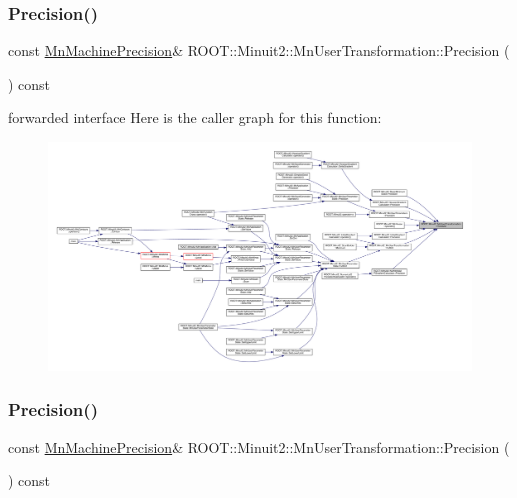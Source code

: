 \subsubsection{\texorpdfstring{Precision()}{Precision()}\hspace{0.1cm}{\footnotesize\ttfamily [2/3]}}
{\footnotesize\ttfamily const \mbox{\hyperlink{classROOT_1_1Minuit2_1_1MnMachinePrecision}{Mn\+Machine\+Precision}}\& R\+O\+O\+T\+::\+Minuit2\+::\+Mn\+User\+Transformation\+::\+Precision (\begin{DoxyParamCaption}{ }\end{DoxyParamCaption}) const\hspace{0.3cm}{\ttfamily [inline]}}

forwarded interface Here is the caller graph for this function\+:
\nopagebreak
\begin{figure}[H]
\begin{center}
\leavevmode
\includegraphics[width=350pt]{d9/d98/classROOT_1_1Minuit2_1_1MnUserTransformation_af9d893a428a4f4d94dfef1bdd3e9936e_icgraph}
\end{center}
\end{figure}
\mbox{\label{classROOT_1_1Minuit2_1_1MnUserTransformation_af9d893a428a4f4d94dfef1bdd3e9936e}} 
\subsubsection{\texorpdfstring{Precision()}{Precision()}\hspace{0.1cm}{\footnotesize\ttfamily [3/3]}}
{\footnotesize\ttfamily const \mbox{\hyperlink{classROOT_1_1Minuit2_1_1MnMachinePrecision}{Mn\+Machine\+Precision}}\& R\+O\+O\+T\+::\+Minuit2\+::\+Mn\+User\+Transformation\+::\+Precision (\begin{DoxyParamCaption}{ }\end{DoxyParamCaption}) const\hspace{0.3cm}{\ttfamily [inline]}}

